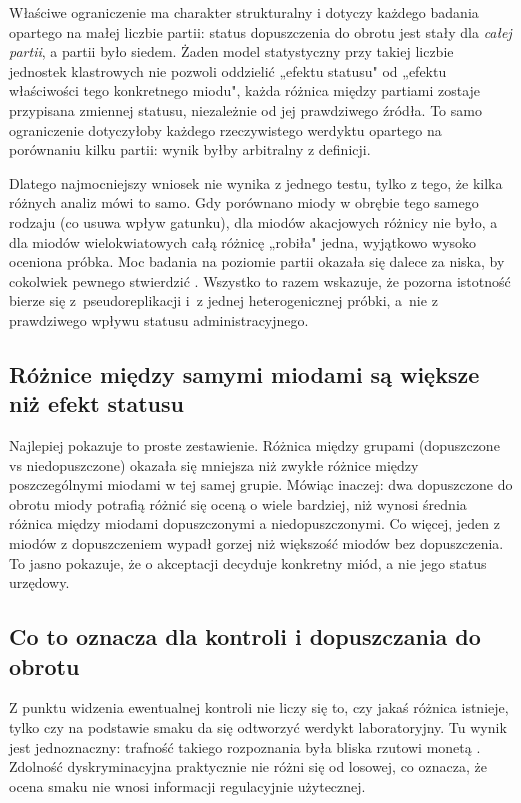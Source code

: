 \documentclass[12pt,a4paper]{article}
\begin{document}
Właściwe ograniczenie ma charakter strukturalny i dotyczy każdego badania
opartego na małej liczbie partii: status dopuszczenia do obrotu jest stały
dla \emph{całej partii}, a partii było siedem. Żaden model statystyczny przy
takiej liczbie jednostek klastrowych nie pozwoli oddzielić „efektu statusu"
od „efektu właściwości tego konkretnego miodu", każda różnica między
partiami zostaje przypisana zmiennej statusu, niezależnie od jej prawdziwego
źródła. To samo ograniczenie dotyczyłoby każdego rzeczywistego werdyktu
opartego na porównaniu kilku partii: wynik byłby arbitralny z definicji.

Dlatego najmocniejszy wniosek nie wynika z jednego testu, tylko z tego, że kilka
różnych analiz mówi to samo. Gdy porównano miody w obrębie tego samego rodzaju
(co usuwa wpływ gatunku), dla miodów akacjowych różnicy nie było, a dla miodów
wielokwiatowych całą różnicę „robiła" jedna, wyjątkowo wysoko oceniona próbka.
Moc badania na poziomie partii okazała się dalece za niska, by cokolwiek pewnego
stwierdzić \cite{Cohen1988}.
Wszystko to razem wskazuje, że pozorna istotność bierze się z~pseudoreplikacji
i~z jednej heterogenicznej próbki, a~nie z prawdziwego wpływu statusu
administracyjnego.

\subsection{Różnice między samymi miodami są większe niż efekt statusu}

Najlepiej pokazuje to proste zestawienie. Różnica między grupami (dopuszczone vs
niedopuszczone) okazała się mniejsza niż zwykłe różnice między poszczególnymi
miodami w tej samej grupie. Mówiąc inaczej: dwa dopuszczone do obrotu miody potrafią różnić się
oceną o wiele bardziej, niż wynosi średnia różnica między miodami dopuszczonymi
a niedopuszczonymi. Co więcej, jeden z miodów z dopuszczeniem wypadł gorzej niż
większość miodów bez dopuszczenia. To jasno pokazuje, że o akceptacji decyduje
konkretny miód, a nie jego status urzędowy.

\subsection{Co to oznacza dla kontroli i dopuszczania do obrotu}

Z punktu widzenia ewentualnej kontroli nie liczy się to, czy jakaś różnica
istnieje, tylko czy na podstawie smaku da się odtworzyć werdykt laboratoryjny.
Tu wynik jest jednoznaczny: trafność takiego rozpoznania była bliska rzutowi monetą
\cite{HanleyMcNeil1982}. Zdolność dyskryminacyjna praktycznie nie różni się od
losowej, co oznacza, że ocena smaku nie wnosi informacji regulacyjnie użytecznej.
\end{document}
